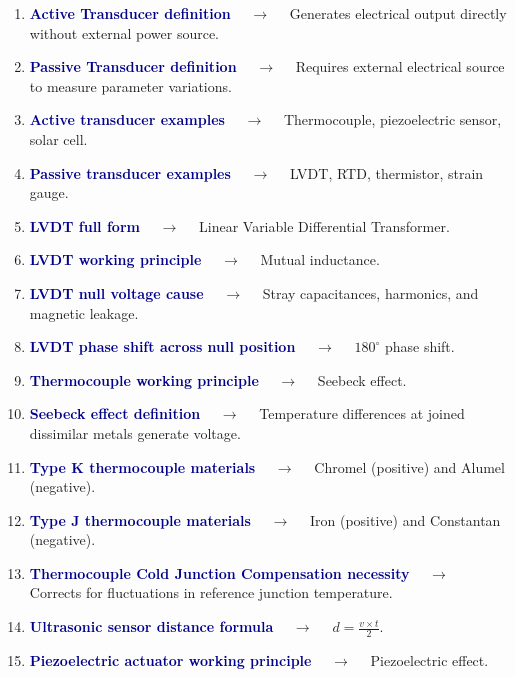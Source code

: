 \documentclass[11pt,a4paper]{article}
\begin{document}
\begin{enumerate}[label=\arabic*., leftmargin=*, labelsep=0.8em, itemsep=0.35em, parsep=0.1em, topsep=0.2em]
  \item \textcolor{darkblue}{\textbf{Active Transducer definition}} $\quad\to\quad$ Generates electrical output directly without external power source.
  \item \textcolor{darkblue}{\textbf{Passive Transducer definition}} $\quad\to\quad$ Requires external electrical source to measure parameter variations.
  \item \textcolor{darkblue}{\textbf{Active transducer examples}} $\quad\to\quad$ Thermocouple, piezoelectric sensor, solar cell.
  \item \textcolor{darkblue}{\textbf{Passive transducer examples}} $\quad\to\quad$ LVDT, RTD, thermistor, strain gauge.
  \item \textcolor{darkblue}{\textbf{LVDT full form}} $\quad\to\quad$ Linear Variable Differential Transformer.
  \item \textcolor{darkblue}{\textbf{LVDT working principle}} $\quad\to\quad$ Mutual inductance.
  \item \textcolor{darkblue}{\textbf{LVDT null voltage cause}} $\quad\to\quad$ Stray capacitances, harmonics, and magnetic leakage.
  \item \textcolor{darkblue}{\textbf{LVDT phase shift across null position}} $\quad\to\quad$ $180^\circ$ phase shift.
  \item \textcolor{darkblue}{\textbf{Thermocouple working principle}} $\quad\to\quad$ Seebeck effect.
  \item \textcolor{darkblue}{\textbf{Seebeck effect definition}} $\quad\to\quad$ Temperature differences at joined dissimilar metals generate voltage.
  \item \textcolor{darkblue}{\textbf{Type K thermocouple materials}} $\quad\to\quad$ Chromel (positive) and Alumel (negative).
  \item \textcolor{darkblue}{\textbf{Type J thermocouple materials}} $\quad\to\quad$ Iron (positive) and Constantan (negative).
  \item \textcolor{darkblue}{\textbf{Thermocouple Cold Junction Compensation necessity}} $\quad\to\quad$ Corrects for fluctuations in reference junction temperature.
  \item \textcolor{darkblue}{\textbf{Ultrasonic sensor distance formula}} $\quad\to\quad$ $d = \frac{v \times t}{2}$.
  \item \textcolor{darkblue}{\textbf{Piezoelectric actuator working principle}} $\quad\to\quad$ Piezoelectric effect.

\end{enumerate}
\end{document}

